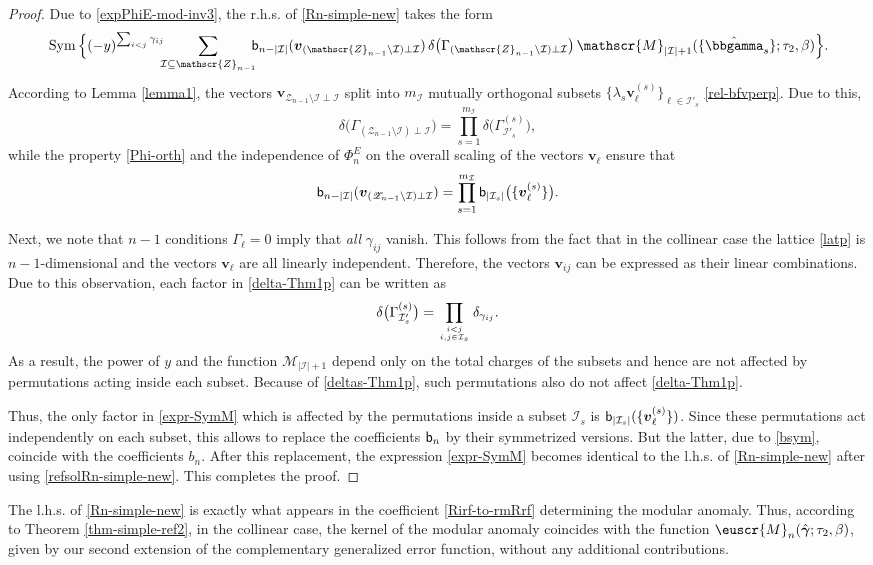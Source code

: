 \documentclass[12pt,letterpaper]{JHEP3}
\def\be{\begin{equation}}
\def\ee{\end{equation}}
\def\Sym{\,{\rm Sym}\, }
\newcommand{\cI}{\mathcal{I}}
\newcommand{\bsf}{{\sf b}}
\def\Mv{\mathscr{M}}
\def\Zv{\mathscr{Z}}
\def\euM{\euscr{M}}
\newcommand{\bfv}{{\boldsymbol v}}
\newcommand{\bfgam}{{\boldsymbol \gamma}}
\def\bfhgam{\hat\bfgam}
\def\hbbgam{\hat\bbgamma}
\begin{document}
\begin{proof}
Due to \eqref{expPhiE-mod-inv3}, the r.h.s. of \eqref{Rn-simple-new} takes the form
\be 
\Sym \Bigl\{ (-y)^{\sum_{i<j}\gamma_{ij} }
	\!\!\!\sum_{\cI\subseteq \Zv_{n-1}}\!\!\!
	\bsf_{n-|\cI|}(\bfv_{(\Zv_{n-1}\setminus\cI)\perp\cI})\,
	\delta\bigl(\Gamma_{(\Zv_{n-1}\setminus\cI) \perp\cI}\bigr)
	\,	\Mv_{|\cI|+1}(\{\hbbgam_s\};\tau_2,\beta)
	\Bigr\}.
	\label{expr-SymM}
\ee 
According to Lemma \ref{lemma1}, the vectors $\bfv_{\Zv_{n-1}\setminus\cI\perp\cI}$ split into $m_\cI$ mutually orthogonal subsets 
$\{\lambda_s\bfv^{(s)}_\ell\}_{\ell\in\cI'_s}$ \eqref{rel-bfvperp}. 
Due to this, 
\be 
\delta\bigl(\Gamma_{(\Zv_{n-1}\setminus\cI) \perp\cI}\bigr) = 
\prod_{s=1}^{m_\cI}\delta\bigl(\Gamma^{(s)}_{\cI'_s}\bigr),
\label{delta-Thm1p}
\ee 
while the property \eqref{Phi-orth} and the independence of 
$\Phi^E_n$ on the overall scaling of the vectors $\bfv_\ell$ ensure that 
\be
\bsf_{n-|\cI|}(\bfv_{(\Zv_{n-1}\setminus\cI) \perp\cI})
=\prod_{s=1}^{m_\cI}\bsf_{|\cI_s|}\bigl(\{\bfv^{(s)}_\ell\}\bigr).
\ee

Next, we note that $n-1$ conditions $\Gamma_\ell=0$ imply that {\it all} $\gamma_{ij}$ vanish.
This follows from the fact that in the collinear case the lattice \eqref{latp} is $n-1$-dimensional 
and the vectors $\bfv_\ell$ are all linearly independent. Therefore, the vectors $\bfv_{ij}$
can be expressed as their linear combinations.
Due to this observation, each factor in \eqref{delta-Thm1p} can be written as 
\be 
\delta\bigl(\Gamma^{(s)}_{\cI'_s}\bigr)=\prod_{i<j\atop i,j\in \cI_s}\delta_{\gamma_{ij}}.
\label{deltas-Thm1p}
\ee 
As a result, the power of $y$ and 
the function $\Mv_{|\cI|+1}$ depend only on the total charges of the subsets and hence are not affected by 
permutations acting inside each subset. Because of \eqref{deltas-Thm1p}, such permutations also do not affect \eqref{delta-Thm1p}.

Thus, the only factor in \eqref{expr-SymM} which is affected by the permutations inside a subset $\cI_s$ is 
$\bsf_{|\cI_s|}(\{\bfv^{(s)}_\ell\})$. Since these permutations act independently on each subset, this allows to 
replace the coefficients $\bsf_n$ by their symmetrized versions.
But the latter, due to \eqref{bsym}, coincide with the coefficients $b_n$.
After this replacement, the expression \eqref{expr-SymM} becomes identical to the l.h.s. of \eqref{Rn-simple-new}
after using \eqref{refsolRn-simple-new}. This completes the proof.
\end{proof}

The l.h.s. of \eqref{Rn-simple-new} is exactly what appears in the coefficient \eqref{Rirf-to-rmRrf} determining the modular anomaly.
Thus, according to Theorem \ref{thm-simple-ref2}, in the collinear case, 
the kernel of the modular anomaly coincides with the function $\euM_n(\bfhgam;\tau_2,\beta)$,
given by our second extension of the complementary generalized error function, without any additional contributions.
\end{document}
